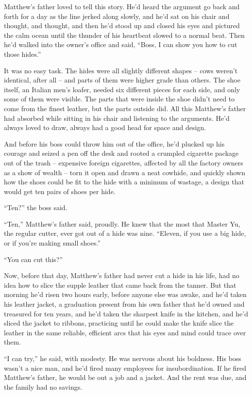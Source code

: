 Matthew's father loved to tell this story. He'd heard the argument
go back and forth for a day as the line jerked along slowly, and
he'd sat on his chair and thought, and thought, and then he'd stood
up and closed his eyes and pictured the calm ocean until the
thunder of his heartbeat slowed to a normal beat. Then he'd walked
into the owner's office and said, ``Boss, I can show you how to cut
those hides.''

It was no easy task. The hides were all slightly different shapes
-- cows weren't identical, after all -- and parts of them were
higher grade than others. The shoe itself, an Italian men's loafer,
needed six different pieces for each side, and only some of them
were visible. The parts that were inside the shoe didn't need to
come from the finest leather, but the parts outside did. All this
Matthew's father had absorbed while sitting in his chair and
listening to the arguments. He'd always loved to draw, always had a
good head for space and design.

And before his boss could throw him out of the office, he'd plucked
up his courage and seized a pen off the desk and rooted a crumpled
cigarette package out of the trash -- expensive foreign cigarettes,
affected by all the factory owners as a show of wealth -- torn it
open and drawn a neat cowhide, and quickly shown how the shoes
could be fit to the hide with a minimum of wastage, a design that
would get ten pairs of shoes per hide.

``Ten?'' the boss said.

``Ten,'' Matthew's father said, proudly. He knew that the most that
Master Yu, the regular cutter, ever got out of a hide was nine.
``Eleven, if you use a big hide, or if you're making small shoes.''

``You can cut this?''

Now, before that day, Matthew's father had never cut a hide in his
life, had no idea how to slice the supple leather that came back
from the tanner. But that morning he'd risen two hours early,
before anyone else was awake, and he'd taken his leather jacket, a
graduation present from his own father that he'd owned and
treasured for ten years, and he'd taken the sharpest knife in the
kitchen, and he'd sliced the jacket to ribbons, practicing until he
could make the knife slice the leather in the same reliable,
efficient arcs that his eyes and mind could trace over them.

``I can try,'' he said, with modesty. He was nervous about his
boldness. His boss wasn't a nice man, and he'd fired many employees
for insubordination. If he fired Matthew's father, he would be out
a job and a jacket. And the rent was due, and the family had no
savings.

